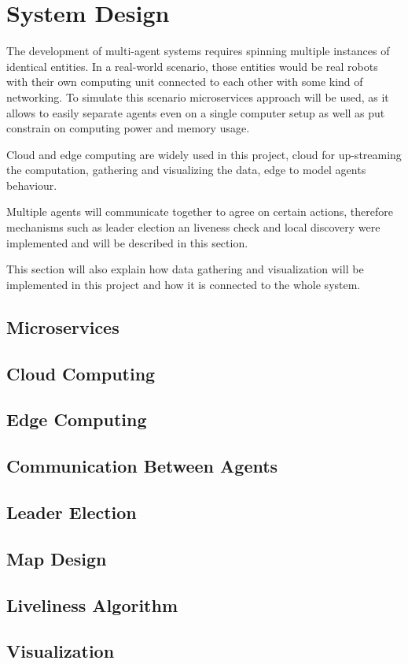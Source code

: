 \chapter{System Design}
The development of multi-agent systems requires spinning multiple instances of identical entities. In a real-world scenario, those entities would be real robots with their own computing unit connected to each other with some kind of networking. To simulate this scenario microservices approach will be used, as it allows to easily separate agents even on a single computer setup as well as put constrain on computing power and memory usage.

Cloud and edge computing are widely used in this project, cloud for up-streaming the computation, gathering and visualizing the data, edge to model agents behaviour.

Multiple agents will communicate together to agree on certain actions, therefore mechanisms such as leader election an liveness check and local discovery were implemented and will be described in this section.

This section will also explain how data gathering and visualization will be implemented in this project and how it is connected to the whole system.
\section{Microservices}


\section{Cloud Computing}


\section{Edge Computing}


\section{Communication Between Agents}


\section{Leader Election}


\section{Map Design}


\section{Liveliness Algorithm}


\section{Visualization}
\label{sec:0308}
